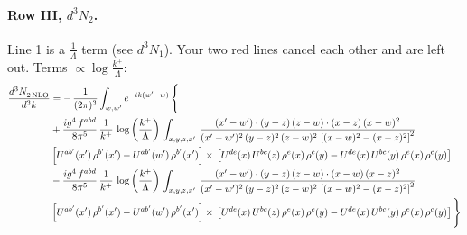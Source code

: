 \documentclass[10pt]{article}
\numberwithin{equation}{section}
\begin{document}
\paragraph{Row III, $d^3N_2$.}
Line 1 is a $\frac{1}{\Lambda}$ term (see $d^3N_1$). Your two red lines cancel each other and are left out.
\noindent Terms $\propto\log\frac{k^+}{\Lambda}$:
\begin{align}
   \frac{d^{3}N_{2\,\rm NLO}^{\rm}}{d^{3}k}  & =  -\,\frac{1}{(2\pi)^{3}}  \int_{w, w^\prime} e^{-ik(w^\prime-w)}\, \Bigg\{\notag \\
&  + \frac{ig^{4}\, f^{abd}}{8\pi^{5}}\, \frac{1}{k^{+}}\,\log{\left(\frac{k^{+}}{\Lambda}\right)}\, \int_{x,y,z,x'}\,\frac{(x'-w')\cdot  (y-z)\, (z-w)\cdot (x-z)\, (x-w)^{2}}{(x'-w')^{2}\, (y-z)^{2}\, (z-w)^{2}\,\left[(x-w)^{2}-(x-z)^{2}\right]^{2}}\, \notag \\ & \left[U^{ab'}(x')\,\rho^{b'}(x')-U^{ab'}(w')\, \rho^{b'}(x')\right]\times\,\left[U^{de}(x)\,U^{bc}(z)\, \rho^{e}(x)\,\rho^{c}(y)-U^{de}(x)\,U^{bc}(y)\,\rho^{e}(x)\,\rho^{c}(y)\right] \notag \\
&   - \frac{ig^{4}\, f^{abd}}{8\pi^{5}}\, \frac{1}{k^{+}}\,\log{\left(\frac{k^{+}}{\Lambda}\right)}\, \int_{x,y,z,x'}\,\frac{(x'-w')\cdot  (y-z)\, (z-w)\cdot (x-w)\, (x-z)^{2}}{(x'-w')^{2}\, (y-z)^{2}\, (z-w)^{2}\,\left[(x-w)^{2}-(x-z)^{2}\right]^{2}}\, \notag \\ & \left[U^{ab'}(x')\,\rho^{b'}(x')-U^{ab'}(w')\, \rho^{b'}(x')\right]\times\,\left[U^{de}(x)\,U^{bc}(z)\, \rho^{e}(x)\,\rho^{c}(y)-U^{de}(x)\,U^{bc}(y)\,\rho^{e}(x)\,\rho^{c}(y)\right]\Bigg\} \label{eq:J:G1IIIN2}
\end{align}
\end{document}
